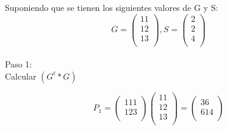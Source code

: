 \documentclass[
	11pt, %
]{beamer}
\begin{document}
\begin{frame}
  \frametitle{}
  Suponiendo que se tienen los siguientes valores de G y S:
  \[G= \begin{pmatrix}
    1 1\\
    1 2\\
    1 3\\
  \end{pmatrix},
  S = \begin{pmatrix}
    2\\
    2\\
    4\\
  \end{pmatrix}\]\\
  \bigskip %
  Paso 1:\\
  
  Calcular $(G^{t} * G)$
  
  \bigskip %

  \[P_{1}= \begin{pmatrix}
    1 1 1\\
    1 2 3\\
  \end{pmatrix}
  \begin{pmatrix}
    1 1\\
    1 2\\
    1 3\\
  \end{pmatrix} =
  \begin{pmatrix}
    3 6\\
    6 14\\
  \end{pmatrix}\]
  
  
\end{frame}
\end{document}
